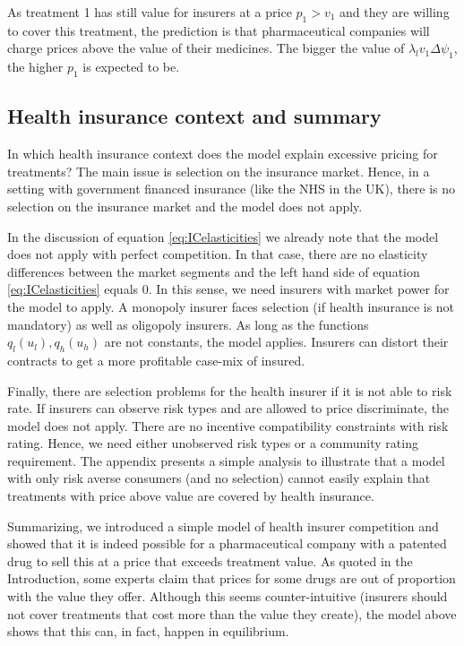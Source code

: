 \documentclass[a4paper,12pt]{article}
\begin{document}
As treatment 1 has still value for insurers at a price \(p_1 > v_1\) and they are willing to cover this treatment, the prediction is that pharmaceutical companies will charge prices above the value of their medicines. The bigger the value of \(\lambda_l v_1 \Delta \psi_1\), the higher \(p_1\) is expected to be.

\subsection{Health insurance context and summary}
\label{sec:org792322e}

In which health insurance context does the model explain excessive pricing for treatments? The main issue is selection on the insurance market. Hence, in a setting with government financed insurance (like the NHS in the UK), there is no selection on the insurance market and the model does not apply.

In the discussion of equation \eqref{eq:ICelasticities} we already note that the model does not apply with perfect competition. In that case, there are no elasticity differences between the market segments and the left hand side of equation \eqref{eq:ICelasticities} equals 0. In this sense, we need insurers with market power for the model to apply. A monopoly insurer faces selection (if health insurance is not mandatory) as well as oligopoly insurers. As long as the functions \(q_l(u_l),q_h(u_h)\) are not constants, the model applies. Insurers can distort their contracts to get a more profitable case-mix of insured. 

Finally, there are selection problems for the health insurer if it is not able to risk rate. If insurers can observe risk types and are allowed to price discriminate, the model does not apply. There are no incentive compatibility constraints with risk rating. Hence, we need either unobserved risk types or a community rating requirement. 
The appendix presents a simple analysis to illustrate that a model with only risk averse consumers (and no selection) cannot easily explain that treatments with price above value are covered by health insurance. 

Summarizing, we introduced a simple model of health insurer competition and showed that it is indeed possible for a pharmaceutical company with a patented drug to sell this at a price that exceeds treatment value. As quoted in the Introduction, some experts claim that prices for some drugs are out of proportion with the value they offer. Although this seems counter-intuitive (insurers should not cover treatments that cost more than the value they create), the model above shows that this can, in fact, happen in equilibrium.
\end{document}
